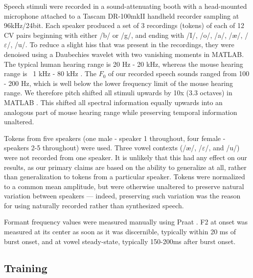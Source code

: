 Speech stimuli were recorded in a sound-attenuating booth with a head-mounted microphone attached to a Tascam DR-100mkII handheld recorder sampling at 96kHz/24bit. Each speaker produced a set of 3 recordings (tokens) of each of 12 CV pairs beginning with either /b/ or /g/, and ending with /I/, /o/, /a/, /\ae/, /$\varepsilon$/, /u/. To reduce a slight hiss that was present in the recordings, they were denoised using a Daubechies wavelet with two vanishing moments in MATLAB. The typical human hearing range is 20 Hz - 20 kHz, whereas the mouse hearing range is ~1 kHz - 80 kHz \citep{Radziwon2009}. The $F_0$ of our recorded speech sounds ranged from 100 - 200 Hz, which is well below the lower frequency limit of the mouse hearing range. We therefore pitch shifted all stimuli upwards by 10x (3.3 octaves) in MATLAB \citep{Mathworks}. This shifted all spectral information equally upwards into an analogous part of mouse hearing range while preserving temporal information unaltered.

Tokens from five speakers (one male - speaker 1 throughout, four female - speakers 2-5 throughout) were used. Three vowel contexts (/\ae/, /$\varepsilon$/, and /u/) were not recorded from one speaker. It is unlikely that this had any effect on our results, as our primary claims are based on the ability to generalize at all, rather than generalization to tokens from a particular speaker. Tokens were normalized to a common mean amplitude, but were otherwise unaltered to preserve natural variation between speakers --- indeed, preserving such variation was the reason for using naturally recorded rather than synthesized speech.

Formant frequency values were measured manually using Praat \citep{Boersma2001}. F2 at onset was measured at its center as soon as it was discernible, typically within 20 ms of burst onset, and at vowel steady-state, typically 150-200ms after burst onset.

\subsection{Training}

